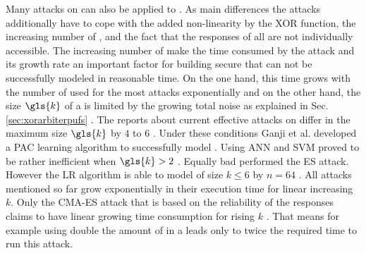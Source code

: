 Many attacks on \apufs can also be applied to \xpufs.
As main differences the attacks additionally have to cope with the added non-linearity by the \ac{XOR} function, the increasing number of \apufs, and the fact that the responses of all \apufs are not individually accessible.
The increasing number of \apufs make the time consumed by the attack and its growth rate an important factor for building secure \xpufs that can not be successfully modeled in reasonable time.
On the one hand, this time grows with the number of used \apufs for the most attacks exponentially and on the other hand, the size $\gls{k}$ of a \xpuf is limited by the growing total noise as explained in Sec. \ref{sec:xorarbiterpufs} \cite{Ruhrmair2010ModelingFunctions}.
The reports about current effective attacks on \xpufs differ in the maximum size $\gls{k}$ by $4$ to $6$ \cite{Ganji2015WhyPUFs, Xu2014Hybrid}.
Under these conditions Ganji et al. developed a \ac{PAC} learning algorithm to successfully model \xpufs \cite{Ganji2015WhyPUFs}.
Using \ac{ANN} and \ac{SVM} proved to be rather inefficient when $\gls{k} > 2$ \cite{Hospodar2012MachineUsability}.
Equally bad performed the \ac{ES} attack.
However the \ac{LR} algorithm is able to model \xpufs of size $k \le 6$ by $n = 64$ \cite{Ruhrmair2010ModelingFunctions}.
All attacks mentioned so far grow exponentially in their execution time for linear increasing $k$.
Only the \ac{CMA-ES} attack that is based on the reliability of the responses claims to have linear growing time consumption for rising $k$ \cite{Becker2015ThePUFs}.
That means for example using double the amount of \apufs in a \xpufs leads only to twice the required time to run this attack.


